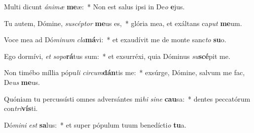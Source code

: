 \item Multi dicunt \textit{á}\textit{ni}\textit{mæ} \textbf{me}æ:~* Non est salus ipsi in De\textit{o} \textbf{e}jus.
\item Tu autem, Dómine, \textit{su}\textit{scép}\textit{tor} \textbf{me}us es,~* glória mea, et exáltans ca\textit{put} \textbf{me}um.
\item Voce mea ad Dó\textit{mi}\textit{num} \textit{cla}\textbf{má}vi:~* et exaudívit me de monte sanc\textit{to} \textbf{su}o.
\item Ego dormívi, \textit{et} \textit{so}\textit{po}\textbf{rá}tus sum:~* et exsurréxi, quia Dóminus \textit{su}\textbf{scé}pit me.
\item Non timébo míllia pópu\textit{li} \textit{cir}\textit{cum}\textbf{dán}tis me:~* exsúrge, Dómine, salvum me fac, De\textit{us} \textbf{me}us.
\item Quóniam tu percussísti omnes adversántes mi\textit{hi} \textit{si}\textit{ne} \textbf{cau}sa:~* dentes peccatórum con\textit{tri}\textbf{vís}ti.
\item Dó\textit{mi}\textit{ni} \textit{est} \textbf{sa}lus:~* et super pópulum tuum benedícti\textit{o} \textbf{tu}a.
